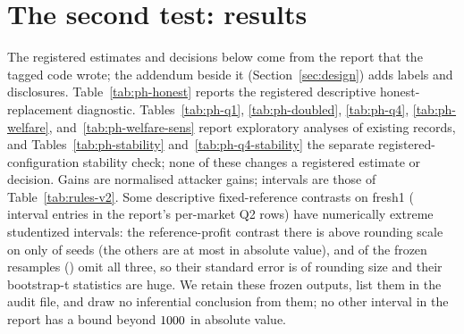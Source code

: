 \documentclass[11pt]{article}
\begin{document}
\section{The second test: results}\label{sec:results}
The registered estimates and decisions below come from the report that the tagged code wrote; the addendum beside it (Section~\ref{sec:design}) adds labels and disclosures. Table~\ref{tab:ph-honest} reports the registered descriptive honest-replacement diagnostic. Tables~\ref{tab:ph-q1}, \ref{tab:ph-doubled}, \ref{tab:ph-q4}, \ref{tab:ph-welfare}, and~\ref{tab:ph-welfare-sens} report exploratory analyses of existing records, and Tables~\ref{tab:ph-stability} and~\ref{tab:ph-q4-stability} the separate registered-configuration stability check; none of these changes a registered estimate or decision. Gains are normalised attacker gains; intervals are those of Table~\ref{tab:rules-v2}. Some descriptive fixed-reference contrasts on fresh1 ( interval entries in the report's per-market Q2 rows) have numerically extreme studentized intervals: the reference-profit contrast there is above rounding scale on only  of  seeds (the others are at most  in absolute value), and  of the  frozen resamples () omit all three, so their standard error is of rounding size and their bootstrap-t statistics are huge. We retain these frozen outputs, list them in the audit file, and draw no inferential conclusion from them; no other interval in the report has a bound beyond $1000$ in absolute value.
\end{document}
